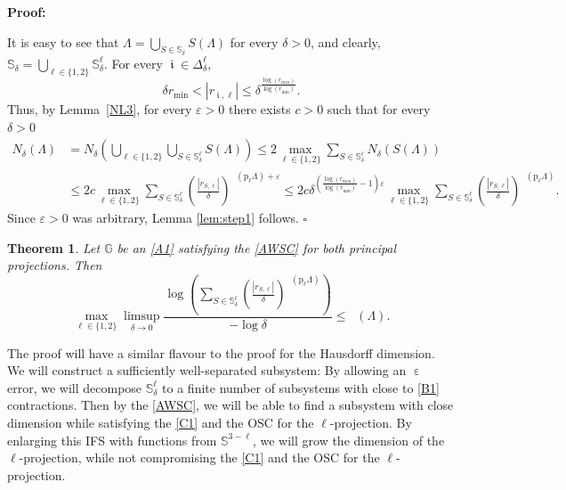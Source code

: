 \documentclass[a4paper, 11pt]{article}
\newenvironment{Proof}{\noindent \textbf{Proof:}}{\hfill$\square$\\}
\DeclareMathOperator{\iii}{\mathfrak{i}}
\DeclareMathOperator{\eps}{\varepsilon}
\DeclareMathOperator{\dB}{\dim_{\mathrm{B}}}
\DeclareMathOperator{\dLB}{\underline{\dim}_{\mathrm{B}}}
\numberwithin{equation}{section}
\theoremstyle{plain}
\newtheorem{theorem}{Theorem}[section]
\theoremstyle{remark}
\theoremstyle{definition}
\begin{document}
\begin{Proof} 

It is easy to see that $\Lambda=\bigcup_{S \in \mathbb{S}_\delta}S(\Lambda)$ for every $\delta>0$, and clearly, $\mathbb{S}_\delta=\bigcup_{\ell\in\{1,2\}}\mathbb{S}_\delta^\ell$.
For every $\iii\in\Delta_\delta^\ell$,
\begin{equation*}
\delta r_{\min} < |r_{\iii,\ell}| \leq \delta^{\frac{\log(r_{\max})}{\log(r_{\min})}}.
\end{equation*}
Thus, by Lemma~\ref{NL3}, for every $\varepsilon>0$ there exists $c>0$ such that for every $\delta>0$
\begin{align*}
	N_\delta(\Lambda)&=N_{\delta}\left(\bigcup_{\ell\in\{1,2\}}\bigcup_{S\in\mathbb{S}_{\delta}^{\ell}}S(\Lambda)\right)\leq2\max_{\ell\in\{1,2\}}\sum_{S\in\mathbb{S}_{\delta}^{\ell}}N_{\delta}(S(\Lambda))\\
	&\leq 2c\max_{\ell\in\{1,2\}}\sum_{S\in\mathbb{S}_{\delta}^{\ell}}\left(\frac{|r_{S,\ell}|}{\delta}\right)^{\dB(\mathrm{p}_\ell\Lambda)+\varepsilon}\leq  2c\delta^{(\frac{\log(r_{\max})}{\log(r_{\min})}-1)\varepsilon}\max_{\ell\in\{1,2\}}\sum_{S\in\mathbb{S}_{\delta}^{\ell}}\left(\frac{|r_{S,\ell}|}{\delta}\right)^{\dB(\mathrm{p}_\ell\Lambda)}.
\end{align*}
Since $\varepsilon>0$ was arbitrary, Lemma \ref{lem:step1} follows.
\end{Proof}


\begin{theorem} \label{lem:step2}
Let $\mathbb{G}$ be an \ref{A1} satisfying the \ref{AWSC} for both principal projections. Then
\begin{equation*}
\max_{\ell\in\{1,2\}}\limsup_{\delta\to0}\frac{\log\left(\sum_{S\in\mathbb{S}_{\delta}^{\ell}}\left(\frac{|r_{S,\ell}|}{\delta}\right)^{\dB(\mathrm{p}_\ell\Lambda)}\right)}{-\log\delta}\leq\dLB(\Lambda).
\end{equation*}
\end{theorem}

The proof will have a similar flavour to the proof for the Hausdorff dimension. We will construct a sufficiently well-separated subsystem: By allowing an $\eps$ error, we will decompose $\mathbb{S}_\delta^\ell$ to a finite number of subsystems with close to \ref{B1} contractions. Then by the \ref{AWSC}, we will be able to find a subsystem with close dimension while satisfying the \ref{C1} and the OSC for the $\ell$-projection. By enlarging this IFS with functions from $\mathbb{S}^{3-\ell}$, we will grow the dimension of the $\ell$-projection, while not compromising the \ref{C1} and the OSC for the $\ell$-projection.
\end{document}
